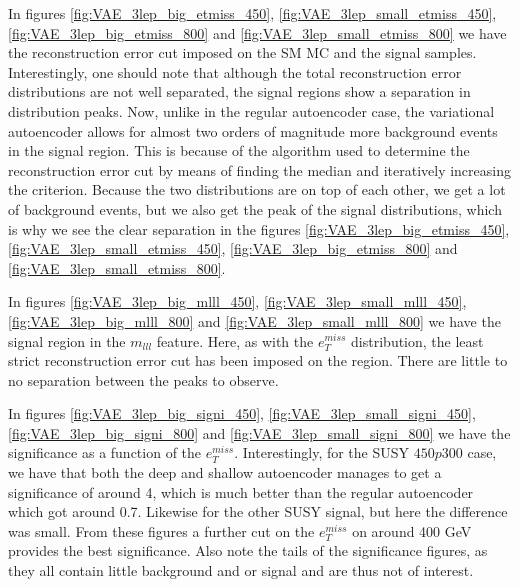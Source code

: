 In figures \ref{fig:VAE_3lep_big_etmiss_450}, \ref{fig:VAE_3lep_small_etmiss_450}, 
\ref{fig:VAE_3lep_big_etmiss_800} and  \ref{fig:VAE_3lep_small_etmiss_800} we have the 
reconstruction error cut imposed on the SM MC and the signal samples. Interestingly, one should 
note that although the total reconstruction error distributions are not well separated, the 
signal regions show a separation in distribution peaks. Now, unlike in the regular autoencoder 
case, the variational autoencoder allows for almost two orders of magnitude more background 
events in the signal region.  This is because of the algorithm used to determine the 
reconstruction error cut by means of finding the median and iteratively increasing the criterion. 
Because the two distributions are on top of each other, we get a lot of background events, 
but we also get the peak of the signal distributions, which is why we see the clear 
separation in the figures \ref{fig:VAE_3lep_big_etmiss_450}, \ref{fig:VAE_3lep_small_etmiss_450}, 
\ref{fig:VAE_3lep_big_etmiss_800} and \ref{fig:VAE_3lep_small_etmiss_800}. \par 

In figures \ref{fig:VAE_3lep_big_mlll_450}, \ref{fig:VAE_3lep_small_mlll_450}, 
\ref{fig:VAE_3lep_big_mlll_800} and  \ref{fig:VAE_3lep_small_mlll_800} we have the signal 
region in the $m_{lll}$ feature. Here, as with the $e_T^{miss}$ distribution, the least 
strict reconstruction error cut has been imposed on the region. There are little to no separation between the peaks 
to observe. \par 

In figures \ref{fig:VAE_3lep_big_signi_450}, \ref{fig:VAE_3lep_small_signi_450}, \ref{fig:VAE_3lep_big_signi_800} and  
\ref{fig:VAE_3lep_small_signi_800} we have the significance as a function of the $e_T^{miss}$.
Interestingly, for the SUSY $450p300$ case, we have that both the deep and shallow 
autoencoder manages to get a significance of around 4, which is much better than the 
regular autoencoder which got around 0.7. Likewise for the other SUSY signal, but 
here the difference was small. From these figures a further cut on the 
$e_T^{miss}$ on around 400 GeV provides the best significance. Also note the tails of 
the significance figures, as they all contain little background and or signal and are 
thus not of interest. 


